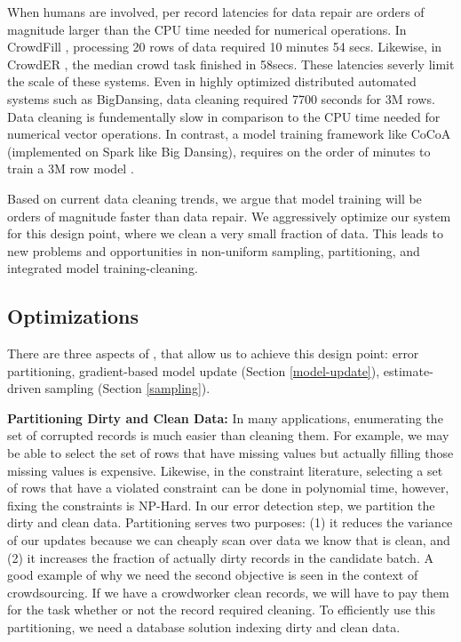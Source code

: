 When humans are involved, per record latencies for data repair are orders of magnitude larger than the CPU time needed for numerical operations.
In CrowdFill \cite{park2014crowdfill}, processing 20 rows of data required 10 minutes 54 secs.
Likewise, in CrowdER \cite{wang2012crowder}, the median crowd task finished in 58secs.
These latencies severly limit the scale of these systems. 
Even in highly optimized distributed automated systems such as BigDansing, data cleaning required 7700 seconds for 3M rows.
Data cleaning is fundementally slow in comparison to the CPU time needed for numerical vector operations.
In contrast, a model training framework like CoCoA (implemented on Spark like Big Dansing), requires on the order of minutes to train a 3M row model \cite{jaggi2014communication}.

Based on current data cleaning trends, we argue that model training will be orders of magnitude faster than data repair.
We aggressively optimize our system for this design point, where we clean a very small fraction of data.
This leads to new problems and opportunities in non-uniform sampling, partitioning, and integrated model training-cleaning.

\iffalse
\subsection{Optimizations}
There are three aspects of \sys, that allow us to achieve this design point: error partitioning, gradient-based model update (Section \ref{model-update}), estimate-driven sampling (Section \ref{sampling}).

\vspace{0.5em}

\noindent\textbf{Partitioning Dirty and Clean Data: } In many applications, enumerating the set of corrupted records is much easier than cleaning them. For example, we may be able to select the set of rows that have missing values but actually filling those missing values is expensive. Likewise, in the constraint literature, selecting a set of rows that have a violated constraint can be done in polynomial time, however, fixing the constraints is NP-Hard.
In our error detection step, we partition the dirty and clean data.
Partitioning serves two purposes: (1) it reduces the variance of our updates because we can cheaply scan over data we know that is clean, and (2) it increases the fraction of actually dirty records in the candidate batch.
A good example of why we need the second objective is seen in the context of crowdsourcing.
If we have a crowdworker clean records, we will have to pay them for the task whether or not the record required cleaning.
To efficiently use this partitioning, we need a database solution indexing dirty and clean data.

